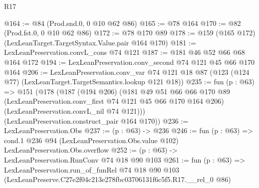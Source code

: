 \begin{lexlean}{R17}
\begin{coremodule}
@164 := @84 (Prod.snd.{0, 0} @10 @62 @86)
@165 := @78 @164
@170 := @82 (Prod.fst.{0, 0} @10 @62 @86)
@172 := @78 @170 @89
@178 := @159 (@165 @172) (LexLeanTarget.TargetSyntax.Value.pair @164 @170)
@181 := LexLeanPreservation.convL_cons @74 @121
@187 := @181 @46 @52 @66 @68 @164 @172
@194 := LexLeanPreservation.conv_second @74 @121 @45 @66 @170 @164
@206 := LexLeanPreservation.conv_var
    @74
    @121
    @18
    @87
    (@123 (@124 @77) (LexLeanTarget.TargetSemantics.lookup @121 @18))
@235 := fun (p : @63) =>
  @151
    (@178
      (@187
        (@194 @206)
        (@181
          @49
          @51
          @66
          @66
          @170
          @89
          (LexLeanPreservation.conv_first @74 @121 @45 @66 @170 @164 @206)
          (LexLeanPreservation.convL_nil @74 @121)))
      (LexLeanPreservation.construct_pair @164 @170))
@236 := LexLeanPreservation.Obs
@237 := (p : @63) -> @236
@246 := fun (p : @63) =>
  cond.{1} @236 @94 (LexLeanPreservation.Obs.value @102) LexLeanPreservation.Obs.overflow
@252 := (p : @63) -> LexLeanPreservation.RunConv @74 @18 @90 @103
@261 := fun (p : @63) =>
  LexLeanPreservation.run_of_funRel
    @74
    @18
    @90
    @103
    (LexLeanPreserve.C27e2f04c213e278fbc03706131f6c5f5.R17.__rel_0 @86)
\end{coremodule}
\end{lexlean}
